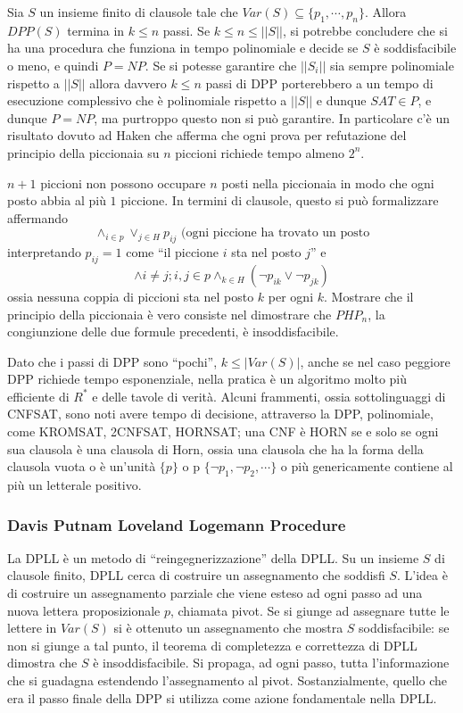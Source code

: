 Sia $S$ un insieme finito di clausole tale che $Var(S) \subseteq \{p_1, \cdots, p_n\}$. 
Allora $DPP(S)$ termina in $k \leq n$ passi. Se $k \leq n \leq ||S||$, 
si potrebbe concludere che si ha una procedura che funziona in tempo 
polinomiale e decide se $S$ è soddisfacibile o meno, e quindi $P = NP$. 
Se si potesse garantire che $||S_i||$ sia sempre polinomiale rispetto 
a $||S||$ allora davvero $k \leq n$ passi di DPP porterebbero a 
un tempo di esecuzione complessivo che è polinomiale rispetto a $||S||$ 
e dunque $SAT \in P$, e dunque $P = NP$, ma purtroppo questo non si 
può garantire. In particolare c'è un risultato dovuto ad Haken che afferma 
che ogni prova per refutazione del principio della piccionaia su $n$ piccioni 
richiede tempo almeno $2^{n}$. 

\begin{defi}
        $n+1$ piccioni non possono occupare $n$ posti nella piccionaia 
        in modo che ogni posto abbia al più $1$ piccione. 
        In termini di clausole, questo si può formalizzare affermando 
        $$
        \land_{i \in p} \lor_{j \in H} p_{ij} \text{ (ogni piccione ha trovato un posto}
        $$
        interpretando $p_{ij} = 1$ come ``il piccione $i$ sta nel posto $j$'' e
        $$
        \land {i \neq j; i, j \in p} \land_{k \in H} (\neg p_{ik} \lor \neg p_{jk})
        $$
        ossia nessuna coppia di piccioni sta nel posto $k$ per ogni $k$. 
        Mostrare che il principio della piccionaia è vero consiste nel dimostrare 
        che $PHP_n$, la congiunzione delle due formule precedenti, 
        è insoddisfacibile. 
\end{defi}

Dato che i passi di DPP sono ``pochi'', $k \leq |Var(S)|$, anche se nel caso 
peggiore DPP richiede tempo esponenziale, nella pratica è un 
algoritmo molto più efficiente di $R^*$ e delle tavole di verità. 
Alcuni frammenti, ossia sottolinguaggi di CNFSAT, sono noti avere tempo di 
decisione, attraverso la DPP, polinomiale, come KROMSAT, 2CNFSAT, HORNSAT; 
una CNF è HORN se e solo se ogni sua clausola è una clausola di Horn, ossia 
una clausola che ha la forma della clausola vuota o è un'unità $\{p\}$ o p 
$\{\neg p_1, \neg p_2, \cdots\}$ o più genericamente contiene al più un 
letterale positivo. 

\subsubsection{Davis Putnam Loveland Logemann Procedure}
La DPLL è un metodo di ``reingegnerizzazione'' della DPLL. Su un insieme $S$ di 
clausole finito, DPLL cerca di costruire un assegnamento che soddisfi $S$. 
L'idea è di costruire un assegnamento parziale che viene esteso ad ogni passo 
ad una nuova lettera proposizionale $p$, chiamata pivot. Se si giunge ad assegnare 
tutte le lettere in $Var(S)$ si è ottenuto un assegnamento che mostra $S$ soddisfacibile: 
se non si giunge a tal punto, il teorema di completezza e correttezza di DPLL 
dimostra che $S$ è insoddisfacibile. Si propaga, ad ogni passo, tutta l'informazione 
che si guadagna estendendo l'assegnamento al pivot. Sostanzialmente, quello che era 
il passo finale della DPP si utilizza come azione fondamentale nella DPLL. 

